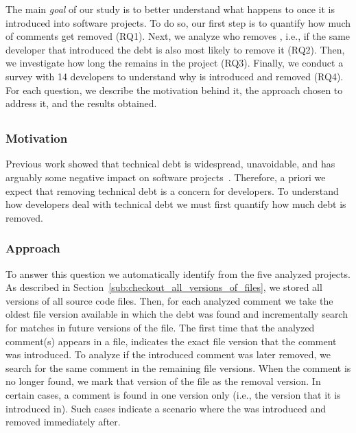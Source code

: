 
The main \emph{goal} of our study is to better understand what happens to \SATD once it is introduced into software projects. To do so, our first step is to quantify how much of \SATD comments get removed (RQ1). Next, we analyze who removes \SATD, i.e., if the same developer that introduced the debt is also most likely to remove it (RQ2). Then, we investigate how long the \SATD remains in the project (RQ3). Finally, we conduct a survey with 14 developers to understand why \SATD is introduced and removed (RQ4). For each question, we describe the motivation behind it, the approach chosen to address it, and the results obtained.



\subsection*{\rqi}
\subsubsection*{Motivation} Previous work showed that technical debt is widespread, unavoidable, and has arguably some negative impact on software projects~\cite{Lim2012Software}. Therefore, a priori we expect that removing technical debt is a concern for developers. To understand how developers deal with  technical debt we must first quantify how much debt is removed. 


\subsubsection*{Approach} To answer this question we automatically identify \SATD from the five analyzed projects. As described in Section~\ref{sub:checkout_all_versions_of_files}, we stored all versions of all source code files. Then, for each analyzed \SATD comment we take the oldest file version available in which the debt was found and incrementally search for matches in future versions of the file. The first time that the analyzed \SATD comment(s) appears in a file, indicates the exact file version that the \SATD comment was introduced. To analyze if the introduced \SATD comment was later removed, we search for the same comment in the remaining file versions. When the comment is no longer found, we mark that version of the file as the removal version. In certain cases, a \SATD comment is found in one version only (i.e., the version that it is introduced in). Such cases indicate a scenario where the \SATD was introduced and removed immediately after. 



